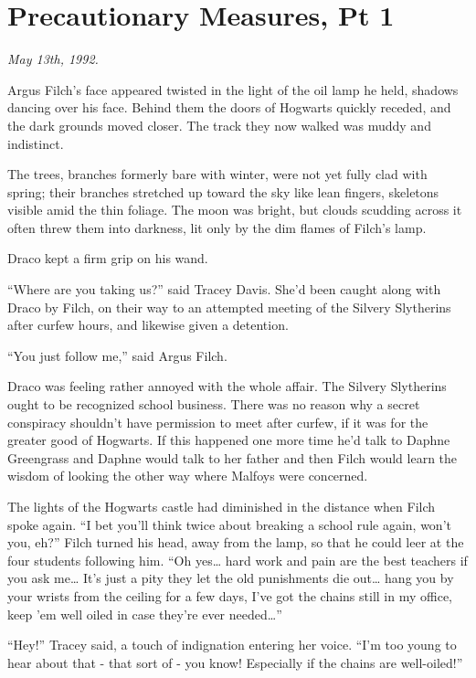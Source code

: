 \chapter{Precautionary Measures, Pt
1}\label{precautionary-measures-pt-1}

\emph{May 13th, 1992.}

Argus Filch's face appeared twisted in the light of the oil lamp he
held, shadows dancing over his face. Behind them the doors of Hogwarts
quickly receded, and the dark grounds moved closer. The track they now
walked was muddy and indistinct.

The trees, branches formerly bare with winter, were not yet fully clad
with spring; their branches stretched up toward the sky like lean
fingers, skeletons visible amid the thin foliage. The moon was bright,
but clouds scudding across it often threw them into darkness, lit only
by the dim flames of Filch's lamp.

Draco kept a firm grip on his wand.

``Where are you taking us?'' said Tracey Davis. She'd been caught along
with Draco by Filch, on their way to an attempted meeting of the Silvery
Slytherins after curfew hours, and likewise given a detention.

``You just follow me,'' said Argus Filch.

Draco was feeling rather annoyed with the whole affair. The Silvery
Slytherins ought to be recognized school business. There was no reason
why a secret conspiracy shouldn't have permission to meet after curfew,
if it was for the greater good of Hogwarts. If this happened one more
time he'd talk to Daphne Greengrass and Daphne would talk to her father
and then Filch would learn the wisdom of looking the other way where
Malfoys were concerned.

The lights of the Hogwarts castle had diminished in the distance when
Filch spoke again. ``I bet you'll think twice about breaking a school
rule again, won't you, eh?'' Filch turned his head, away from the lamp,
so that he could leer at the four students following him. ``Oh
yes\ldots{} hard work and pain are the best teachers if you ask
me\ldots{} It's just a pity they let the old punishments die out\ldots{}
hang you by your wrists from the ceiling for a few days, I've got the
chains still in my office, keep 'em well oiled in case they're ever
needed\ldots{}''

``Hey!'' Tracey said, a touch of indignation entering her voice. ``I'm
too young to hear about that - that sort of - you know! Especially if
the chains are well-oiled!''

